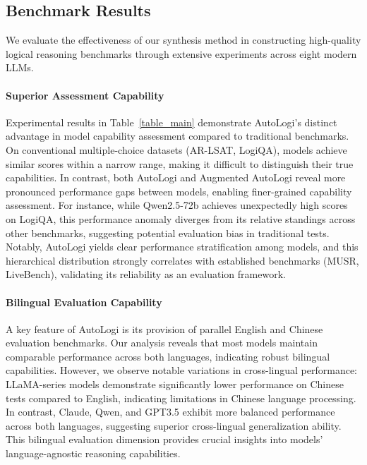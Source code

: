 \subsection{Benchmark Results}
We evaluate the effectiveness of our synthesis method in constructing high-quality logical reasoning benchmarks through extensive experiments across eight modern LLMs.
\paragraph{Superior Assessment Capability}
Experimental results in Table~\ref{table_main} demonstrate AutoLogi's distinct advantage in model capability assessment compared to traditional benchmarks. On conventional multiple-choice datasets (AR-LSAT, LogiQA), models achieve similar scores within a narrow range, making it difficult to distinguish their true capabilities. In contrast, both AutoLogi and Augmented AutoLogi reveal more pronounced performance gaps between models, enabling finer-grained capability assessment. For instance, while Qwen2.5-72b achieves unexpectedly high scores on LogiQA, this performance anomaly diverges from its relative standings across other benchmarks, suggesting potential evaluation bias in traditional tests. Notably, AutoLogi yields clear performance stratification among models, and this hierarchical distribution strongly correlates with established benchmarks (MUSR, LiveBench), validating its reliability as an evaluation framework.

\paragraph{Bilingual Evaluation Capability}
A key feature of AutoLogi is its provision of parallel English and Chinese evaluation benchmarks. Our analysis reveals that most models maintain comparable performance across both languages, indicating robust bilingual capabilities. However, we observe notable variations in cross-lingual performance: LLaMA-series models demonstrate significantly lower performance on Chinese tests compared to English, indicating limitations in Chinese language processing. In contrast, Claude, Qwen, and GPT3.5 exhibit more balanced performance across both languages, suggesting superior cross-lingual generalization ability. This bilingual evaluation dimension provides crucial insights into models' language-agnostic reasoning capabilities.

